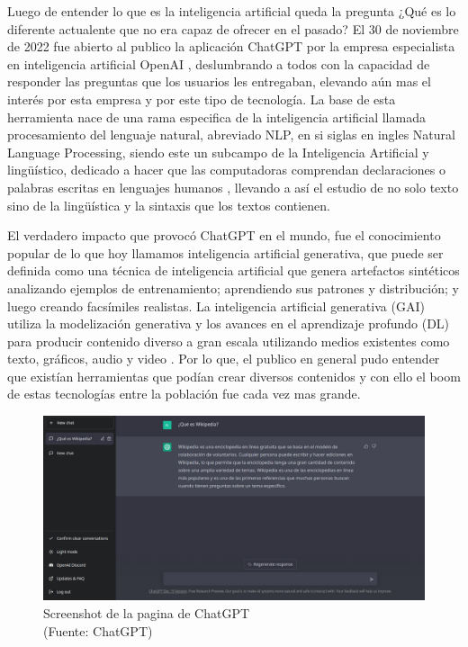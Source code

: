 \newpage

\par Luego de entender lo que es la inteligencia artificial queda la pregunta ¿Qué es lo diferente actualente que no era capaz de ofrecer en el pasado? 
El 30 de noviembre de 2022 fue abierto al publico la aplicación ChatGPT por la empresa especialista en inteligencia artificial OpenAI \cite{mt3}, deslumbrando a todos 
con la capacidad de responder las preguntas que los usuarios les entregaban, elevando aún mas el interés por esta empresa y por este tipo de tecnología.
La base de esta herramienta nace de una rama especifica de la inteligencia artificial llamada procesamiento del lenguaje 
natural, abreviado NLP, en si siglas en ingles Natural Language Processing, siendo este un subcampo de la Inteligencia Artificial y lingüístico, dedicado a hacer que las 
computadoras comprendan declaraciones o palabras escritas en lenguajes humanos \cite{nlpeda}, llevando a así el estudio de no solo texto sino de la lingüística y la sintaxis que los textos contienen.


\par El verdadero impacto que provocó ChatGPT en el mundo, fue el conocimiento popular de lo que hoy llamamos inteligencia 
artificial generativa, que puede ser definida como una técnica de inteligencia artificial que genera artefactos sintéticos analizando 
ejemplos de entrenamiento; aprendiendo sus patrones y distribución; y luego creando facsímiles realistas. La inteligencia 
artificial generativa (GAI) utiliza la modelización generativa y los avances en el aprendizaje profundo (DL) para producir 
contenido diverso a gran escala utilizando medios existentes como texto, gráficos, audio y video \cite{mt2}. Por lo que, el publico en
general pudo entender que existían herramientas que podían crear diversos contenidos y con ello el boom de estas 
tecnologías entre la población fue cada vez mas grande. \\


\begin{figure}[ht!]
    \centering
    \includegraphics[width=.8\textwidth]{figures/ea2.png}
    \caption[Screenshot de la pagina de ChatGPT]{Screenshot de la pagina de ChatGPT \\
    {\scriptsize (Fuente: ChatGPT)}}

    \label{fig:ea2}
\end{figure}

